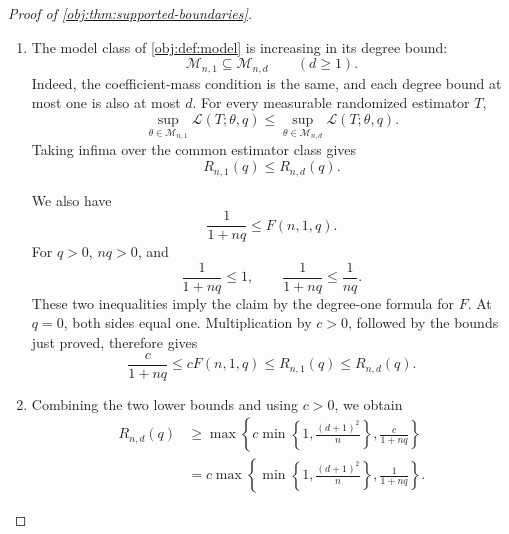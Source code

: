 \documentclass[11pt]{article}
\begin{document}
\begin{proof}[Proof of \cref{obj:thm:supported-boundaries}]
\begin{enumerate}
Finally, the rounding bound gives
\[
\frac mn\ge\frac14,
\qquad
\frac{\kappa s}{4}
\le\frac{m\kappa s}{n}.
\]
Both sides of the latter inequality are positive, so
\[
\left(\frac{\kappa s}{4}\right)^2
\le
\left(\frac{m\kappa s}{n}\right)^2,
\qquad
\frac14\left(\frac{\kappa s}{4}\right)^2
=
\frac{s^2}{640000\pi^2}.
\]
Combining these estimates with \(F(n,1,q)\le s^2\) gives
\[
\begin{aligned}
cF(n,1,q)
&\le \frac{s^2}{2560000\pi^2}\\
&\le \frac{s^2}{640000\pi^2}\\
&=\frac14\left(\frac{\kappa s}{4}\right)^2\\
&\le\frac14\left(\frac{m\kappa s}{n}\right)^2\\
&\le R_{n,1}(q).
\end{aligned}
\]
Together with the first case, this proves the degree-one frontier bound.

\item The model class of \cref{obj:def:model} is increasing in its degree bound:
\[
\mathcal M_{n,1}\subseteq\mathcal M_{n,d}
\qquad(d\ge1).
\]
Indeed, the coefficient-mass condition is the same, and each degree bound at most one is also at most \(d\). For every measurable randomized estimator \(T\),
\[
\sup_{\theta\in\mathcal M_{n,1}}\mathcal L(T;\theta,q)
\le
\sup_{\theta\in\mathcal M_{n,d}}\mathcal L(T;\theta,q).
\]
Taking infima over the common estimator class gives
\[
R_{n,1}(q)\le R_{n,d}(q).
\]

We also have
\[
\frac1{1+nq}\le F(n,1,q).
\]
For \(q>0\), \(nq>0\), and
\[
\frac1{1+nq}\le1,
\qquad
\frac1{1+nq}\le\frac1{nq}.
\]
These two inequalities imply the claim by the degree-one formula for \(F\). At \(q=0\), both sides equal one. Multiplication by \(c>0\), followed by the bounds just proved, therefore gives
\[
\frac{c}{1+nq}
\le cF(n,1,q)
\le R_{n,1}(q)
\le R_{n,d}(q).
\]

\item Combining the two lower bounds and using \(c>0\), we obtain
\[
\begin{aligned}
R_{n,d}(q)
&\ge
\max\left\{
c\min\left\{1,\frac{(d+1)^2}{n}\right\},
\frac{c}{1+nq}
\right\}\\
&=
c\max\left\{
\min\left\{1,\frac{(d+1)^2}{n}\right\},
\frac1{1+nq}
\right\}.
\end{aligned}
\]


\end{enumerate}
\end{proof}
\end{document}
